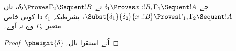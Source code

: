 \documentclass[../../../include/open-logic-section]{subfiles}
\begin{document}
\begin{prop}
جے $\delta_1 \Proves x:!B, \Gamma_1 \Sequent
!A$ تے $\delta_2 \Proves \Gamma_2 \Sequent !B$، تاں
$\Subst{\delta_1}{\delta_2}{x:!B} \Proves \Gamma_1, \Gamma_2 \Sequent
!A$، بشرطیکہ~$\delta_1$ دا کوئی خاص متغیر~$\Gamma_2$ وچ نہ آوے۔
\end{prop}

\begin{proof}
$\pheight{\delta}$ اُتے استقرا نال۔
\end{proof}
\end{document}
